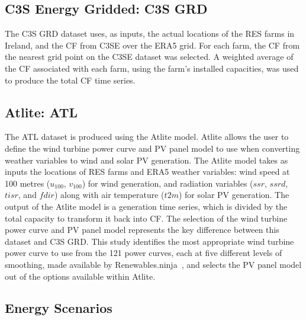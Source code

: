 \documentclass[preprint, 12pt]{elsarticle}
\begin{document}
\subsection{C3S Energy Gridded: C3S GRD}
\label{sec:c3se_g}

The C3S GRD dataset uses, as inputs, the actual locations of the RES farms in Ireland, and the CF from C3SE over the ERA5 grid. For each farm, the CF from the nearest grid point on the C3SE dataset was selected. A weighted average of the CF associated with each farm, using the farm's installed capacities, was used to produce the total CF time series.

\subsection{Atlite: ATL} 
\label{sec:atlite}

The ATL dataset is produced using the Atlite model. Atlite allows the user to define the wind turbine power curve and PV panel model to use when converting weather variables to wind and solar PV generation. The Atlite model takes as inputs the locations of RES farms and ERA5 weather variables: wind speed at 100 metres ($u_{100}$, $v_{100}$) for wind generation, and radiation variables ($ssr$, $ssrd$, $tisr$, and $fdir$) along with air temperature ($t2m$) for solar PV generation. The output of the Atlite model is a generation time series, which is divided by the total capacity to transform it back into CF. The selection of the wind turbine power curve and PV panel model represents the key difference between this dataset and C3S GRD. This study identifies the most appropriate wind turbine power curve to use from the 121 power curves, each at five different levels of smoothing, made available by Renewables.ninja~\citep{staffell2016wake}, and selects the PV panel model out of the options available within Atlite.

\subsection{Energy Scenarios}
\label{sec:scenarios}
\end{document}
